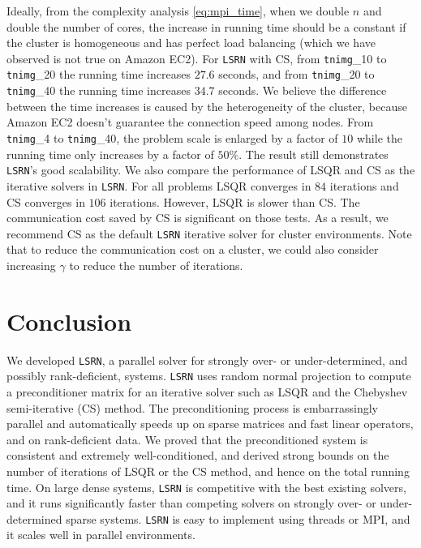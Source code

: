 \documentclass{siamltex}
\begin{document}
Ideally, from the complexity analysis \eqref{eq:mpi_time}, when we double $n$
and double the number of cores, the increase in running time should be a
constant if the cluster is homogeneous and has perfect load balancing (which we
have observed is not true on Amazon EC2).  For \texttt{LSRN} with CS, from
\texttt{tnimg}\_10 to \texttt{tnimg}\_20 the running time increases $27.6$
seconds, and from \texttt{tnimg}\_20 to \texttt{tnimg}\_40 the running time
increases $34.7$ seconds.  We believe the difference between the time increases
is caused by the heterogeneity of the cluster, because Amazon EC2 doesn't
guarantee the connection speed among nodes.  From \texttt{tnimg}\_4 to
\texttt{tnimg}\_40, the problem scale is enlarged by a factor of $10$ while the
running time only increases by a factor of $50\%$. The result still demonstrates
\texttt{LSRN}'s good scalability. We also compare the performance of LSQR and CS
as the iterative solvers in \texttt{LSRN}. For all problems LSQR converges in
$84$ iterations and CS converges in $106$ iterations. However, LSQR is slower
than CS. The communication cost saved by CS is significant on those tests. As a
result, we recommend CS as the default \texttt{LSRN} iterative solver for
cluster environments. Note that to reduce the communication cost on a cluster,
we could also consider increasing $\gamma$ to reduce the number of iterations.


\section{Conclusion}
\label{sec:conclusion}

We developed \texttt{LSRN}, a parallel solver for strongly over- or
under-determined, and possibly rank-deficient, systems.  \texttt{LSRN} uses
random normal projection to compute a preconditioner matrix for an iterative
solver such as LSQR and the Chebyshev semi-iterative (CS) method. The
preconditioning process is embarrassingly parallel and automatically speeds up
on sparse matrices and fast linear operators, and on rank-deficient data.  We
proved that the preconditioned system is consistent and extremely
well-conditioned, and derived strong bounds on the number of iterations of LSQR
or the CS method, and hence on the total running time. On large dense systems,
\texttt{LSRN} is competitive with the best existing solvers, and it runs
significantly faster than competing solvers on strongly over- or
under-determined sparse systems. \texttt{LSRN} is easy to implement using
threads or MPI, and it scales well in parallel environments.
\end{document}
